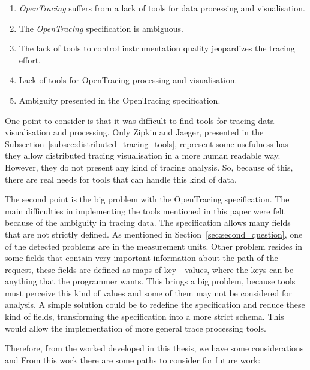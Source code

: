 \begin{enumerate}
    \item \emph{OpenTracing} suffers from a lack of tools for data processing and visualisation.
    \item The \emph{OpenTracing} specification is ambiguous.
    \item The lack of tools to control instrumentation quality jeopardizes the tracing effort.

    \item Lack of tools for OpenTracing processing and visualisation.
    \item Ambiguity presented in the OpenTracing specification.
\end{enumerate}

One point to consider is that it was difficult to find tools for tracing data visualisation and processing. Only Zipkin and Jaeger, presented in the Subsection~\ref{subsec:distributed_tracing_tools}, represent some usefulness has they allow distributed tracing visualisation in a more human readable way. However, they do not present any kind of tracing analysis. So, because of this, there are real needs for tools that can handle this kind of data.

The second point is the big problem with the OpenTracing specification. The main difficulties in implementing the tools mentioned in this paper were felt because of the ambiguity in tracing data. The specification allows many fields that are not strictly defined. As mentioned in Section~\ref{sec:second_question}, one of the detected problems are in the measurement units. Other problem resides in some fields that contain very important information about the path of the request, these fields are defined as maps of key - values, where the keys can be anything that the programmer wants. This brings a big problem, because tools must perceive this kind of values and some of them may not be considered for analysis. A simple solution could be to redefine the specification and reduce these kind of fields, transforming the specification into a more strict schema. This would allow the implementation of more general trace processing tools.


Therefore, from the worked developed in this thesis, we have some considerations and        
From this work there are some paths to consider for future work:


